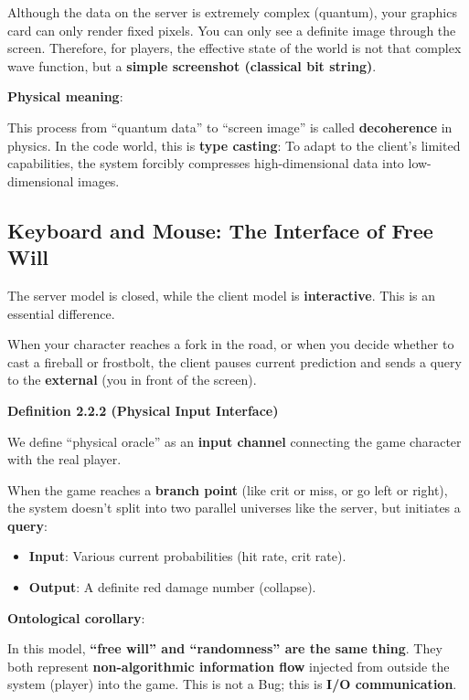 Although the data on the server is extremely complex (quantum), your graphics card can only render fixed pixels. You can only see a definite image through the screen. Therefore, for players, the effective state of the world is not that complex wave function, but a \textbf{simple screenshot (classical bit string)}.

\textbf{Physical meaning}:

This process from ``quantum data'' to ``screen image'' is called \textbf{decoherence} in physics. In the code world, this is \textbf{type casting}: To adapt to the client's limited capabilities, the system forcibly compresses high-dimensional data into low-dimensional images.

\subsection{Keyboard and Mouse: The Interface of Free Will}

The server model is closed, while the client model is \textbf{interactive}. This is an essential difference.

When your character reaches a fork in the road, or when you decide whether to cast a fireball or frostbolt, the client pauses current prediction and sends a query to the \textbf{external} (you in front of the screen).

\textbf{Definition 2.2.2 (Physical Input Interface)}

We define ``physical oracle'' as an \textbf{input channel} connecting the game character with the real player.

When the game reaches a \textbf{branch point} (like crit or miss, or go left or right), the system doesn't split into two parallel universes like the server, but initiates a \textbf{query}:

\begin{itemize}
\item \textbf{Input}: Various current probabilities (hit rate, crit rate).
\item \textbf{Output}: A definite red damage number (collapse).
\end{itemize}

\textbf{Ontological corollary}:

In this model, \textbf{``free will'' and ``randomness'' are the same thing}. They both represent \textbf{non-algorithmic information flow} injected from outside the system (player) into the game. This is not a Bug; this is \textbf{I/O communication}.

